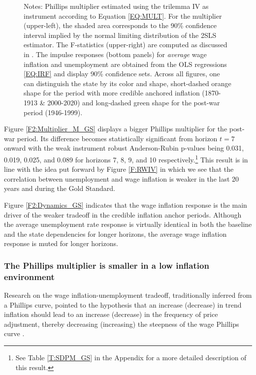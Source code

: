 \documentclass[12pt]{article}
\newcommand{\annote}[1]{\parbox{\textwidth}{\renewcommand{\baselinestretch}{1.0}\vspace{12pt} \footnotesize Notes: #1}}
\begin{document}
\begin{figure}[h!]
\begin{subfigure}[b]{0.9\textwidth}
		\end{subfigure}
		\annote{Phillips multiplier estimated using the trilemma IV as instrument according to Equation \eqref{EQ:MULT}. For the multiplier (upper-left), the shaded area corresponds to the 90\% confidence interval implied by the normal limiting distribution of the 2SLS estimator. The F-statistics (upper-right) are computed as discussed in \cite{Olea2013}. The impulse responses (bottom panels) for \textit{average} wage inflation and unemployment are obtained from the OLS regressions \eqref{EQ:IRF} and display 90\% confidence sets. Across all figures, one can distinguish the state by its color and shape, short-dashed orange shape for the period with more credible anchored inflation (1870-1913 \& 2000-2020) and long-dashed green shape for the post-war period (1946-1999).}
	
\end{figure}

Figure \ref{F2:Multiplier_M_GS} displays a bigger Phillips multiplier for the post-war period. Its difference becomes statistically significant from horizon $t=7$ onward with the weak instrument robust Anderson-Rubin p-values being 0.031, 0.019, 0.025, and 0.089 for horizons 7, 8, 9, and 10 respectively.\footnote{See Table \ref{T:SDPM_GS} in the Appendix for a more detailed description of this result.} This result is in line with the idea put forward by Figure \ref{F:RWIV} in which we see that the correlation between unemployment and wage inflation is weaker in the last 20 years and during the Gold Standard.

Figure \ref{F2:Dynamics_GS} indicates that the wage inflation response is the main driver of the weaker tradeoff in the credible inflation anchor periods. Although the average unemployment rate response is virtually identical in both the baseline and the state dependencies for longer horizons, the average wage inflation response is muted for longer horizons.

\subsubsection{The Phillips multiplier is smaller in a low inflation environment}

Research on the wage inflation-unemployment tradeoff, traditionally inferred from a Phillips curve, pointed to the hypothesis that  an increase (decrease) in trend inflation should lead to an increase (decrease) in the frequency of price adjustment, thereby decreasing (increasing) the steepness of the wage Phillips curve \citep{Benati2007}.
\end{document}

